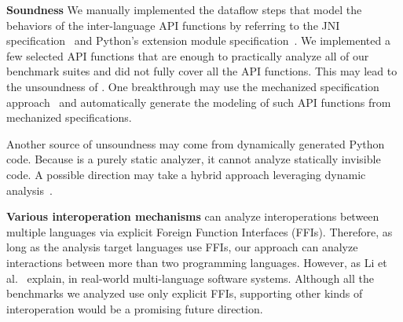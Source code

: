 \textbf{Soundness} We manually implemented the dataflow steps that model the
behaviors of the inter-language API functions by referring to the JNI
specification~\cite{jnispec} and Python's extension module
specification~\cite{pythoncspec}.  We implemented a few selected API functions
that are enough to practically analyze all of our benchmark suites and did not
fully cover all the API functions.  This may lead to the unsoundness of \ours.
One breakthrough may use the mechanized specification
approach~\cite{jiset,jest,jstar,jsaver,justgen} and automatically generate the
modeling of such API functions from mechanized specifications.

Another source of unsoundness may come from dynamically generated Python code.
Because \ours is a purely static analyzer, it cannot analyze statically
invisible code.  A possible direction may take a hybrid approach leveraging
dynamic analysis~\cite{polycruise}.

\textbf{Various interoperation mechanisms} \ours can analyze interoperations
between multiple languages via explicit Foreign Function Interfaces (FFIs).
Therefore, as long as the analysis target languages use FFIs, our approach can
analyze interactions between more than two programming languages.  However, as
Li et al.~\cite{vulnerable-multi} explain,  in real-world multi-language software systems.
Although all the benchmarks we analyzed use only explicit FFIs, supporting
other kinds of interoperation would be a promising future direction.
